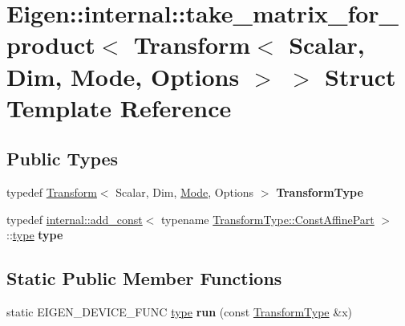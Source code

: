 \hypertarget{struct_eigen_1_1internal_1_1take__matrix__for__product_3_01_transform_3_01_scalar_00_01_dim_00_01_mode_00_01_options_01_4_01_4}{}\section{Eigen\+::internal\+::take\+\_\+matrix\+\_\+for\+\_\+product$<$ Transform$<$ Scalar, Dim, Mode, Options $>$ $>$ Struct Template Reference}
\label{struct_eigen_1_1internal_1_1take__matrix__for__product_3_01_transform_3_01_scalar_00_01_dim_00_01_mode_00_01_options_01_4_01_4}
\subsection*{Public Types}
\begin{DoxyCompactItemize}
\item 
\mbox{\label{struct_eigen_1_1internal_1_1take__matrix__for__product_3_01_transform_3_01_scalar_00_01_dim_00_01_mode_00_01_options_01_4_01_4_a77ad015b5e9252d508f1086bae3a5f81}} 
typedef \mbox{\hyperlink{class_eigen_1_1_transform}{Transform}}$<$ Scalar, Dim, \mbox{\hyperlink{struct_mode}{Mode}}, Options $>$ {\bfseries Transform\+Type}
\item 
\mbox{\label{struct_eigen_1_1internal_1_1take__matrix__for__product_3_01_transform_3_01_scalar_00_01_dim_00_01_mode_00_01_options_01_4_01_4_ad574e3463713b46e368dd2f77ff468a2}} 
typedef \mbox{\hyperlink{struct_eigen_1_1internal_1_1add__const}{internal\+::add\+\_\+const}}$<$ typename \mbox{\hyperlink{class_eigen_1_1_transform_adfa0bf2d9504548cdc9b9051b2fa9673}{Transform\+Type\+::\+Const\+Affine\+Part}} $>$\+::\mbox{\hyperlink{class_eigen_1_1_transpose}{type}} {\bfseries type}
\end{DoxyCompactItemize}
\subsection*{Static Public Member Functions}
\begin{DoxyCompactItemize}
\item 
\mbox{\label{struct_eigen_1_1internal_1_1take__matrix__for__product_3_01_transform_3_01_scalar_00_01_dim_00_01_mode_00_01_options_01_4_01_4_a07971b051c2857cf6d695b056e952b49}} 
static E\+I\+G\+E\+N\+\_\+\+D\+E\+V\+I\+C\+E\+\_\+\+F\+U\+NC \mbox{\hyperlink{class_eigen_1_1_transpose}{type}} {\bfseries run} (const \mbox{\hyperlink{class_eigen_1_1_transform}{Transform\+Type}} \&x)
\end{DoxyCompactItemize}


